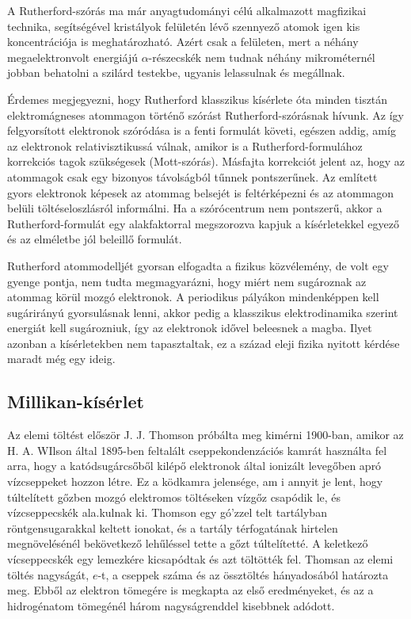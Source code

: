 \documentclass[../main.tex]{subfiles}
\begin{document}
A Rutherford-szórás ma már anyagtudományi célú alkalmazott magfizikai
technika, segítségével kristályok felületén lévő szennyező atomok igen
kis koncentrációja is meghatározható.
Azért csak a felületen, mert a néhány megaelektronvolt energiájú
$\alpha$-részecskék nem tudnak néhány mikrométernél jobban behatolni
a szilárd testekbe, ugyanis lelassulnak és megállnak.

Érdemes megjegyezni, hogy Rutherford klasszikus kísérlete óta minden
tisztán elektromágneses atommagon történő szórást Rutherford-szórásnak
hívunk.
Az így felgyorsított elektronok szóródása is a fenti formulát követi,
egészen addig, amíg az elektronok relativisztikussá válnak, amikor is
a Rutherford-formulához korrekciós tagok szükségesek (Mott-szórás).
Másfajta korrekciót jelent az, hogy az atommagok csak egy bizonyos
távolságból tűnnek pontszerűnek.
Az említett gyors elektronok képesek az atommag belsejét is feltérképezni
és az atommagon belüli töltéseloszlásról informálni.
Ha a szórócentrum nem pontszerű, akkor a Rutherford-formulát egy
alakfaktorral megszorozva kapjuk a kísérletekkel egyező és az elméletbe
jól beleillő formulát.

Rutherford atommodelljét gyorsan elfogadta a fizikus közvélemény,
de volt egy gyenge pontja, nem tudta megmagyarázni, hogy miért nem
sugároznak az atommag körül mozgó elektronok.
A periodikus pályákon mindenképpen kell sugárirányú gyorsulásnak lenni,
akkor pedig a klasszikus elektrodinamika szerint energiát kell sugározniuk,
így az elektronok idővel beleesnek a magba.
Ilyet azonban a kísérletekben nem tapasztaltak, ez a század eleji fizika
nyitott kérdése maradt még egy ideig.

\subsection{Millikan-kísérlet}
Az elemi töltést először J. J. Thomson próbálta meg kimérni 1900-ban, amikor az H. A. WIlson által 1895-ben feltalált cseppekondenzációs kamrát használta fel arra, hogy a katódsugárcsőből kilépő elektronok által ionizált levegőben apró vízcseppeket hozzon létre.
Ez a ködkamra jelensége, am i annyit je lent, hogy túltelített gőzben mozgó elektromos töltéseken vízgőz csapódik le, és vízcseppecskék ala.kulnak ki.
Thomson egy gó'zzel telt tartályban röntgensugarakkal keltett ionokat, és a tartály térfogatának hirtelen megnövelésénél bekövetkező lehűléssel tette
a gőzt túltelítetté. A keletkező vícseppecskék egy lemezkére kicsapódtak és azt töltötték fel. Thomsan az elemi töltés nagyságát, $e$-t, a cseppek száma
és az össztöltés hányadosából határozta meg. Ebből az elektron tömegére is megkapta az első eredményeket, és az a hidrogénatom tömegénél három nagyságrenddel kisebbnek adódott.
\end{document}
